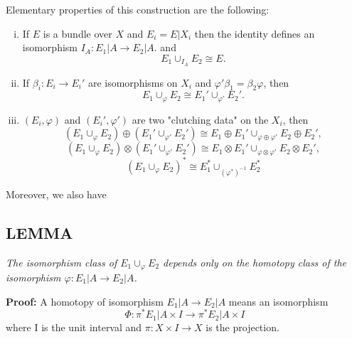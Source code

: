 Elementary properties of this construction are the following:
\begin{enumerate}[(i)]
    \item If $E$ is a bundle over $X$ and $E_i = E \vert X_i$ then the identity defines an isomorphism $I_A: E_1 \vert A \to E_2 \vert A$. and
    \begin{equation*}
        E_1 \cup_{I_A} E_2 \cong E.
    \end{equation*}
    \item If $\beta_i: E_i \to E_i'$ are isomorphisms on $X_i$ and $\varphi'\beta_1 = \beta_2\varphi$, then
    \begin{equation*}
        E_1 \cup_\varphi E_2 \cong  E_1' \cup_{\varphi'} E_2'.
    \end{equation*}
    \item $(E_i, \varphi)$ and $(E_i', \varphi')$ are two "clutching data" on the $X_i$, then
    \begin{equation*}
        (E_1 \cup_\varphi E_2) \oplus (E_1' \cup_{\varphi'} E_2') \cong E_1 \oplus E_1' \cup_{\varphi \oplus \varphi'} E_2 \oplus E_2',
    \end{equation*}
    \begin{equation*}
        (E_1 \cup_\varphi E_2) \otimes (E_1' \cup_{\varphi'} E_2') \cong E_1 \otimes E_1' \cup_{\varphi \otimes \varphi'} E_2 \otimes E_2',
    \end{equation*}
    \begin{equation*}
        (E_1 \cup_\varphi E_2)^* \cong E_1^* \cup_{(\varphi^*)^{-1}} E_2^*
    \end{equation*}
\end{enumerate}

Moreover, we also have

\subsection{LEMMA}\label{lem:1.4.6} \textit{The isomorphism class of $E_1 \cup_\varphi E_2$ depends only on the homotopy class of the isomorphism $\varphi: E_1 \vert A \to E_2 \vert A$.} \par 

\textbf{Proof:} A homotopy of isomorphism $E_1 \vert A \to E_2 \vert A$ means an isomorphism
\begin{equation*}
    \Phi: \pi^* E_1 \vert A \times I \to \pi^* E_2 \vert A \times I
\end{equation*}
where I is the unit interval and $\pi: X \times I \to X$ is the projection. \par 

